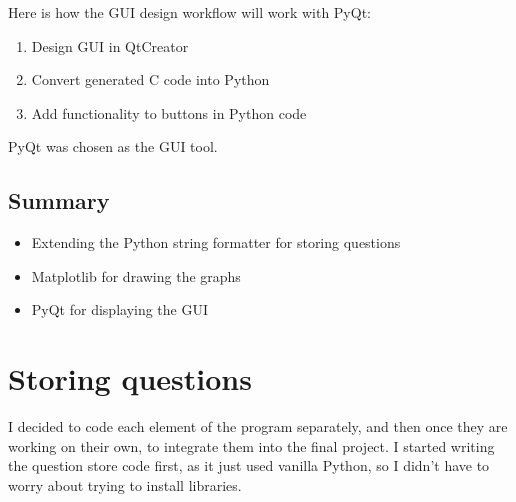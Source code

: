 Here is how the GUI design workflow will work with PyQt:
\begin{enumerate}
	\item Design GUI in QtCreator
	\item Convert generated C code into Python
	\item Add functionality to buttons in Python code
\end{enumerate}

PyQt was chosen as the GUI tool.

\subsection{Summary}
\begin{itemize}
	\item Extending the Python string formatter for storing questions
	\item Matplotlib for drawing the graphs
	\item PyQt for displaying the GUI
\end{itemize}
\section{Storing questions}
I decided to code each element of the program separately, and then once they are working on their own, to integrate them into the final project. I started writing the question store code first, as it just used vanilla Python, so I didn't have to worry about trying to install libraries. 

